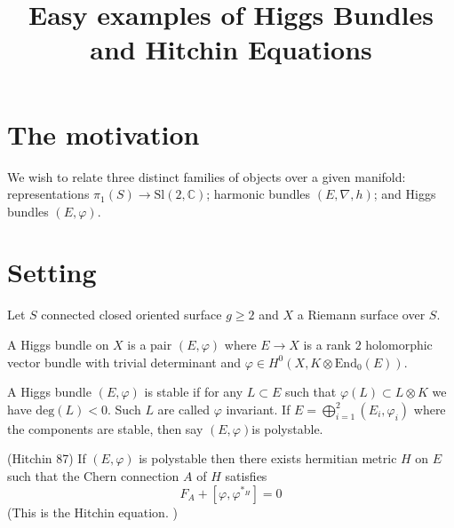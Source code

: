 % 


\title{Easy examples of Higgs Bundles and Hitchin Equations}
\author{}
\date{}

 
\maketitle
\Large
\section{The motivation} %

We wish to relate three distinct families of objects over a given manifold:
representations $ \pi_1 ( S) \rightarrow  \mathrm{Sl}(2, \mathbb{C} ) $;
harmonic bundles $ ( E, \nabla, h )$;
and Higgs bundles $(E, \varphi)$.



\section{Setting} %

Let $S$ connected closed oriented surface $ g \geq 2 $ and $X$ a Riemann surface over $ S$. 

\begin{definition}
    A Higgs bundle on $X$ is a pair $(E, \varphi)$ 
    where $E \rightarrow  X $ is a rank $2$ holomorphic vector bundle 
    with trivial determinant and $ \varphi \in H^0 ( X, K \otimes \mathrm{End} _0 (E) ) $.
\end{definition}

\begin{definition}
    A Higgs bundle $(E, \varphi)$ is stable if for any $L \subset E $ such that $ \varphi(L) \subset L \otimes K $ 
    we have $\mathrm{deg}(L) < 0 $. 
    Such $L$ are called $\varphi$ invariant.
    If $ E = \bigoplus_{i = 1} ^2  ( E_i , \varphi _i ) $ where the components are stable, then say $(E, \varphi)$is polystable.
\end{definition}

\begin{theorem}
 (Hitchin 87) 
    If $( E, \varphi) $ is polystable then there exists hermitian metric $H$ on $E$ such that the Chern connection $ A $ of $H$ satisfies 
    \begin{equation}
        F _A + [ \varphi , \varphi ^{*_H} ] = 0  
    \end{equation}
    (This is the Hitchin equation. ) 
\end{theorem}

